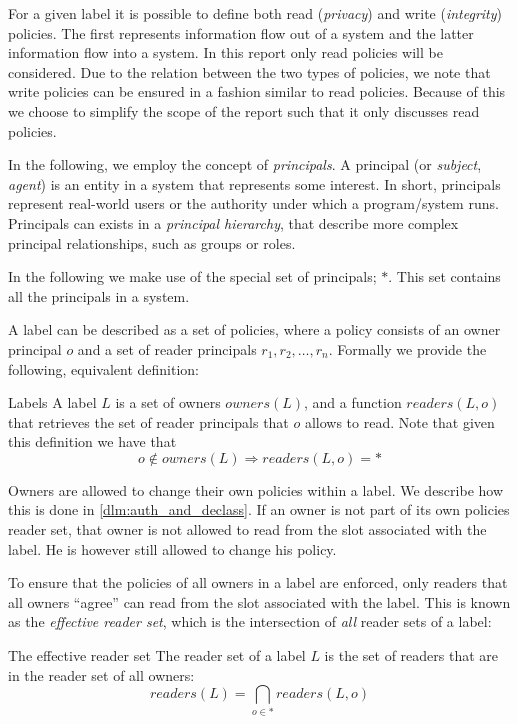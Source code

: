 For a given label it is possible to define both read (\emph{privacy}) and write (\emph{integrity}) policies.
The first represents information flow out of a system and the latter information flow into a system.
In this report only read policies will be considered.
Due to the relation between the two types of policies, we note that write policies can be ensured in a fashion similar to read policies.
Because of this we choose to simplify the scope of the report such that it only discusses read policies.

In the following, we employ the concept of \emph{principals}.
A principal (or \emph{subject}, \emph{agent}) is an entity in a system that represents some interest.
In short, principals represent real-world users or the authority under which a program/system runs.
Principals can exists in a \emph{principal hierarchy}, that describe more complex principal relationships, such as groups or roles.

In the following we make use of the special set of principals; $*$.
This set contains all the principals in a system.

A label can be described as a set of policies, where a policy consists of an owner principal $o$ and a set of reader principals $r_1, r_2, \dots, r_n$.
Formally we provide the following, equivalent definition:
\begin{definition}{Labels}
A label $L$ is a set of owners $owners(L)$, and a function $readers(L, o)$ that retrieves the set of reader principals that $o$ allows to read.
Note that given this definition we have that $$o \notin owners(L) \Rightarrow readers(L, o) = *$$
\end{definition}

Owners are allowed to change their own policies within a label.
We describe how this is done in \cref{dlm:auth_and_declass}.
If an owner is not part of its own policies reader set, that owner is not allowed to read from the slot associated with the label.
He is however still allowed to change his policy.

To ensure that the policies of all owners in a label are enforced, only readers that all owners ``agree'' can read from the slot associated with the label.
This is known as the \emph{effective reader set}, which is the intersection of \emph{all} reader sets of a label:
\begin{definition}{The effective reader set}
  The reader set of a label $L$ is the set of readers that are in the reader set of all owners:
  $$readers(L) = \bigcap_{o \in *} readers(L, o)$$
\end{definition}

